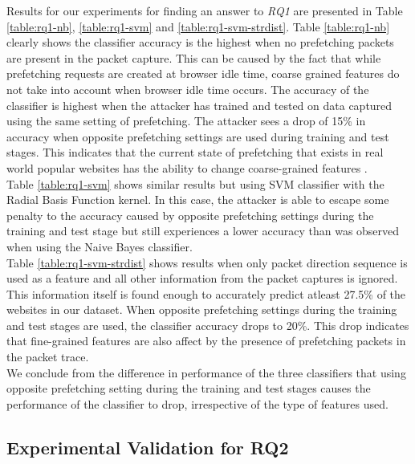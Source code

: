 Results for our experiments for finding an answer to \emph{RQ1} are presented in Table \ref{table:rq1-nb}, \ref{table:rq1-svm} and \ref{table:rq1-svm-strdist}. 
Table \ref{table:rq1-nb} clearly shows the classifier accuracy is the highest when no prefetching packets are present in the packet capture. 
This can be caused by the fact that while prefetching requests are created at browser idle time, coarse grained features do not take into account when browser idle time occurs. 
The accuracy of the classifier is highest when the attacker has trained and tested on data captured using the same setting of prefetching. 
The attacker sees a drop of 15\% in accuracy when opposite prefetching settings are used during training and test stages.
This indicates that the current state of prefetching that exists in real world popular websites has the ability to change coarse-grained features .\\
Table \ref{table:rq1-svm} shows similar results but using SVM classifier with the Radial Basis Function kernel. 
In this case, the attacker is able to escape some penalty to the accuracy caused by opposite prefetching settings during the training and test stage but still experiences a lower accuracy than was observed when using the Naive Bayes classifier.\\
Table \ref{table:rq1-svm-strdist} shows results when only packet direction sequence is used as a feature and all other information from the packet captures is ignored. 
This information itself is found enough to accurately predict atleast 27.5\% of the websites in our dataset. 
When opposite prefetching settings during the training and test stages are used, the classifier accuracy drops to 20\%. This drop indicates that fine-grained features are also affect by the presence of prefetching packets in the packet trace.\\
We conclude from the difference in performance of the three classifiers that using opposite prefetching setting during the training and test stages causes the performance of the classifier to drop, irrespective of the type of features used.\\

\subsection{Experimental Validation for RQ2}
